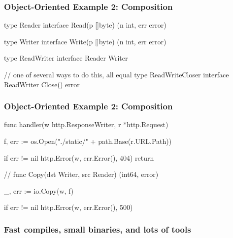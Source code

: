 \documentclass[handout,compress,t,11pt]{beamer}
\begin{document}
\begin{frame}[fragile]
    \frametitle{Object-Oriented Example 2: Composition}
\begin{golang}
type Reader interface {
    Read(p []byte) (n int, err error)
}

type Writer interface {
    Write(p []byte) (n int, err error)
}

type ReadWriter interface {
    Reader
    Writer
}

// one of several ways to do this, all equal
type ReadWriteCloser interface {
    ReadWriter
    Close() error
}
\end{golang}
\end{frame}
\begin{frame}[fragile]
\frametitle{Object-Oriented Example 2: Composition}
\begin{golang}
func handler(w http.ResponseWriter, r *http.Request) {
    f, err := os.Open("./static/" + path.Base(r.URL.Path))

    if err != nil {
        http.Error(w, err.Error(), 404)
        return
    }


    // func Copy(dst Writer, src Reader) (int64, error)

    _, err := io.Copy(w, f)

    if err != nil {
        http.Error(w, err.Error(), 500)
    }
}
\end{golang}
\end{frame}

\begin{frame}
    \frametitle{Fast compiles, small binaries, and lots of tools}
    \vspace{\baselineskip}
    \vspace{\baselineskip}
\end{frame}
\end{document}

